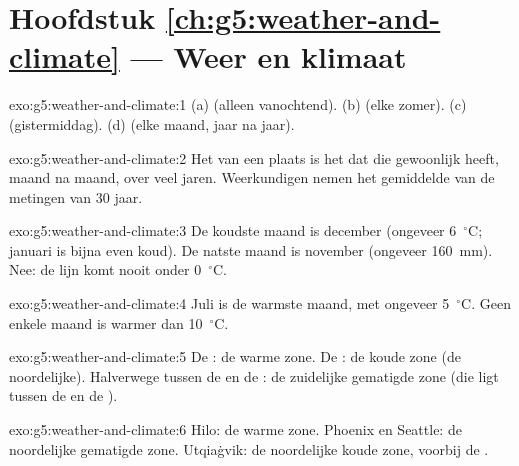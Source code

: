 \section*{Hoofdstuk \ref{ch:g5:weather-and-climate} --- Weer en klimaat}

\begin{solution}{exo:g5:weather-and-climate:1}
(a)  (alleen vanochtend). (b)  (elke zomer). (c) 
(gistermiddag). (d)  (elke maand, jaar na jaar).
\end{solution}

\begin{solution}{exo:g5:weather-and-climate:2}
Het  van een plaats is het  dat die gewoonlijk heeft, maand na
maand, over veel jaren. Weerkundigen nemen het gemiddelde van de metingen
van 30 jaar.
\end{solution}

\begin{solution}{exo:g5:weather-and-climate:3}
De koudste maand is december (ongeveer 6~$^\circ$C; januari is bijna even
koud). De natste maand is november (ongeveer 160~mm). Nee: de lijn komt
nooit onder 0~$^\circ$C.
\end{solution}

\begin{solution}{exo:g5:weather-and-climate:4}
Juli is de warmste maand, met ongeveer 5~$^\circ$C. Geen enkele maand is
warmer dan 10~$^\circ$C.
\end{solution}

\begin{solution}{exo:g5:weather-and-climate:5}
De : de warme zone. De : de koude zone (de noordelijke).
Halverwege tussen de  en de : de zuidelijke gematigde zone
(die ligt tussen de  en de ).
\end{solution}

\begin{solution}{exo:g5:weather-and-climate:6}
Hilo: de warme zone. Phoenix en Seattle: de noordelijke gematigde zone.
Utqiaġvik: de noordelijke koude zone, voorbij de .
\end{solution}

